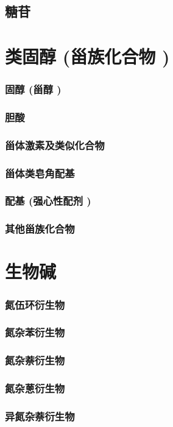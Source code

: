 \documentclass[UTF8]{../03-Chemistry}
\begin{document}
    \subsection{糖苷}
\section{类固醇 (甾族化合物 )}
    \subsubsection{固醇 (甾醇 )}
    \subsubsection{胆酸}
    \subsubsection{甾体激素及类似化合物}
    \subsubsection{甾体类皂角配基}
    \subsubsection{配基 (强心性配剂 )}
    \subsubsection{其他甾族化合物}
\section{生物碱}
    \subsubsection{氮伍环衍生物}
    \subsubsection{氮杂苯衍生物}
    \subsubsection{氮杂萘衍生物}
    \subsubsection{氮杂蒽衍生物}
    \subsubsection{异氮杂萘衍生物}
\end{document}
